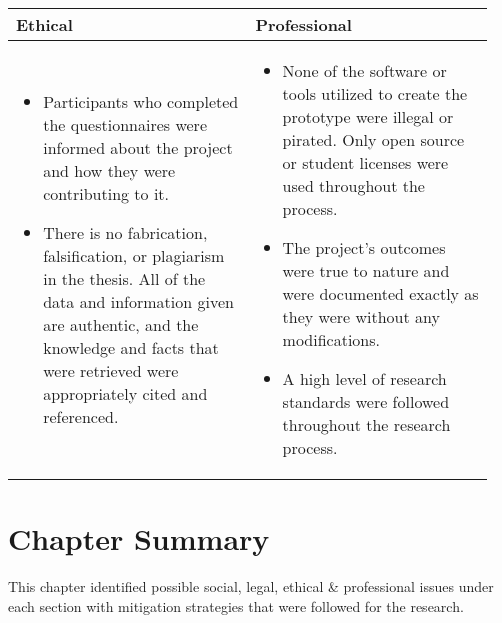 \begin{longtable}{|p{0.473\linewidth}|p{0.473\linewidth}|}
\textbf{Ethical} & \textbf{Professional} \\ 
\hline
\vspace{-7mm}       %
\begin{itemize}[leftmargin=*]
\item Participants who completed the questionnaires were informed about the project and how they were contributing to it.
\item There is no fabrication, falsification, or plagiarism in the thesis. All of the data and information given are authentic, and the knowledge and facts that were retrieved were appropriately cited and referenced.
\vspace{-7mm}       %
\end{itemize}
& 
\vspace{-7mm}       %
\begin{itemize}[leftmargin=*]
\item None of the software or tools utilized to create the prototype were illegal or pirated. Only open source or student licenses were used throughout the process.
\item The project's outcomes were true to nature and were documented exactly as they were without any modifications.
\item A high level of research standards were followed throughout the research process.
\vspace{-7mm}       %
\end{itemize}
\\
\hline
\end{longtable}


\section{Chapter Summary}
This chapter identified possible social, legal, ethical \& professional issues under each section with mitigation strategies that were followed for the research.
